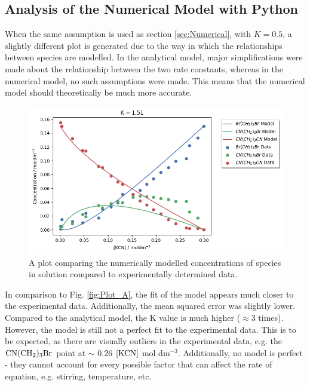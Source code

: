 \documentclass[twoside, 11pt]{article}
\begin{document}
\subsection{Analysis of the Numerical Model with Python}
When the same assumption is used as section \ref{sec:Numerical}, with $K=0.5$, a slightly different plot is generated due to the way in which the relationships between species are modelled. In the analytical model, major simplifications were made about the relationship between the two rate constants, whereas in the numerical model, no such assumptions were made. This means that the numerical model should theoretically be much more accurate.
\begin{figure}[H]
    \centering
    \includegraphics[width=0.8\linewidth]{PartB_Plot.png}
    \caption{A plot comparing the numerically modelled concentrations of species in solution compared to experimentally determined data.}
    \label{fig:Plot_B}
\end{figure}
In comparison to Fig. \ref{fig:Plot_A}, the fit of the model appears much closer to the experimental data. Additionally, the mean squared error was slightly lower. Compared to the analytical model, the K value is much higher ($\approx 3$ times). However, the model is still not a perfect fit to the experimental data. This is to be expected, as there are visually outliers in the experimental data, e.g. the $\ce{CN(CH2)3Br}$ point at $\sim$ 0.26 $\ce{[KCN]}$ mol dm$^{-3}$. Additionally, no model is perfect - they cannot account for every possible factor that can affect the rate of equation, e.g. stirring, temperature, etc.
\newpage
\end{document}
